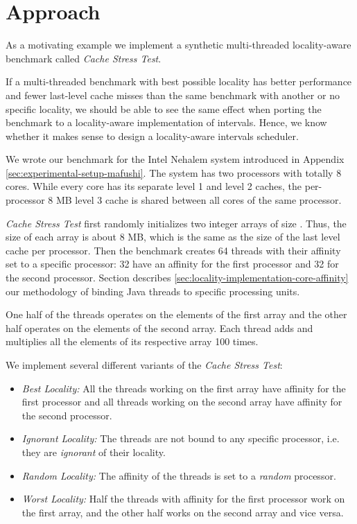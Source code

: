 
\chapter{Approach}
\label{chap:locality-approach}

As a motivating example we implement a synthetic multi-threaded
locality-aware benchmark called \emph{Cache Stress Test}. 

If a multi-threaded benchmark with best possible locality has better
performance and fewer last-level cache misses than the same benchmark
with another or no specific locality, we should be able to see the
same effect when porting the benchmark to a locality-aware
implementation of intervals. Hence, we know whether it makes sense to
design a locality-aware intervals scheduler.

We wrote our benchmark for the Intel Nehalem system introduced in
Appendix \ref{sec:experimental-setup-mafushi}. The system has two
processors with totally 8 cores. While every core has its separate
level 1 and level 2 caches, the per-processor 8 MB level 3 cache is
shared between all cores of the same processor.

\emph{Cache Stress Test} first randomly initializes two integer arrays
of size . Thus, the size of each array is about 8
MB, which is the same as the size of the last level cache per
processor. Then the benchmark creates 64 threads with their affinity
set to a specific processor: 32 have an affinity for the first
processor and 32 for the second processor. Section describes
\ref{sec:locality-implementation-core-affinity} our methodology of
binding Java threads to specific processing units.

One half of the threads operates on the elements of the first array
and the other half operates on the elements of the second array. Each
thread adds and multiplies all the elements of its respective array
100 times.

We implement several different variants of the \emph{Cache Stress
  Test}:

\begin{itemize}
\item \emph{Best Locality:} All the threads working on the first array
  have affinity for the first processor and all threads working on the
  second array have affinity for the second processor.
\item \emph{Ignorant Locality:} The threads are not bound to any
  specific processor, i.e. they are \emph{ignorant} of their locality.
\item \emph{Random Locality:} The affinity of the threads is set to a
  \emph{random} processor.
\item \emph{Worst Locality:} Half the threads with affinity for the
  first processor work on the first array, and the other half works on
  the second array and vice versa.
\end{itemize}

